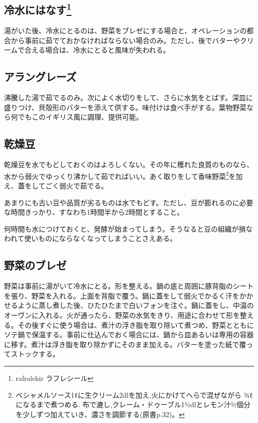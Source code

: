 \hypertarget{rafraichissage}{%
\subsection[冷水にはなす]{\texorpdfstring{冷水にはなす\footnote{rafraîchir
  ラフレシール}}{冷水にはなす}}\label{rafraichissage}}

湯がいた後、冷水にとるのは、野菜をブレゼにする場合と、オペレーションの都合から事前に茹でておかなければならない場合のみ。ただし、後でバターやクリームで合える場合は、冷水にとると風味が失われる。

\hypertarget{cuisson-des-legumes-a-l-anglaise}{%
\subsection{アラングレーズ}\label{cuisson-des-legumes-a-l-anglaise}}

沸騰した湯で茹でるのみ。次によく水切りをして、さらに水気をとばす。深皿に盛りつけ、貝殻形のバターを添えて供する。味付けは食べ手がする。葉物野菜なら何でもこのイギリス風に調理、提供可能。

\hypertarget{cuisson-des-legumes-secs}{%
\subsection{乾燥豆}\label{cuisson-des-legumes-secs}}

乾燥豆を水でもどしておくのはよろしくない。その年に穫れた良質のものなら、水から弱火でゆっくり沸かして茹でればいい。あく取りをして香味野菜\footnote{ベシャメルソース1ℓに生クリーム2dlを加え,火にかけてへらで混ぜながら
  ¾ℓになるまで煮つめる.
  布で漉し,クレーム・ドゥーブル1½dlとレモン汁½個分を少しずつ加えていき、濃さを調節する(原書p.32)。}を加え、蓋をしてごく弱火で茹でる。

あまりにも古い豆や品質が劣るものは水でもどす。ただし、豆が膨れるのに必要な時間きっかり、すなわち1時間半から2時間とすること。

何時間も水につけておくと、発酵が始まってしまう。そうなると豆の組織が損なわれて使いものにならなくなってしまうことさえある。

\hypertarget{braisage-des-legumes}{%
\subsection{野菜のブレゼ}\label{braisage-des-legumes}}

野菜は事前に湯がいて冷水にとる。形を整える。鍋の底と周囲に豚背脂のシートを張り、野菜を入れる。上面を背脂で覆う。鍋に蓋をして弱火でかるく汗をかかせるように蒸し煮した後、ひたひたまで白いフォンを注ぐ。鍋に蓋をし、中温のオーヴンに入れる。火が通ったら、野菜の水気をきり、用途に合わせて形を整える。その後すぐに使う場合は、煮汁の浮き脂を取り除いて煮つめ、野菜とともにソテ鍋で保温する。事前に仕込んでおく場合には、鍋から皿あるいは専用の容器に移す。煮汁は浮き脂を取り除かずにそのまま加える。バターを塗った紙で覆ってストックする。


